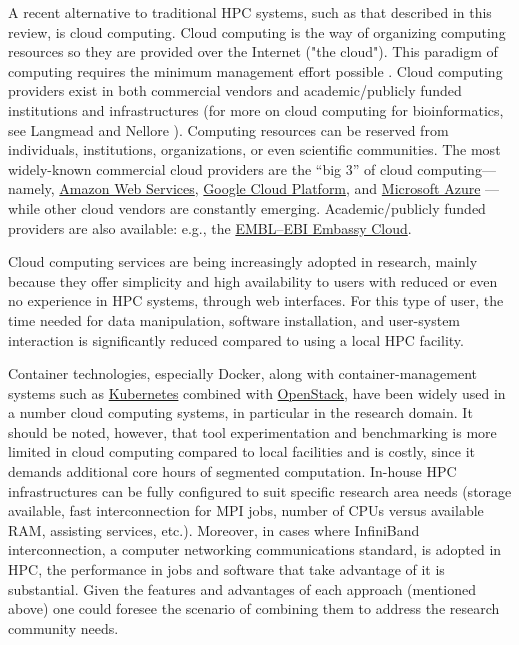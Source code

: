   A recent alternative to traditional HPC systems, such as that described in this review, is cloud computing. 
   Cloud computing is the way of organizing computing resources so they are provided over the Internet ("the cloud"). This paradigm of computing requires the minimum management effort possible \citep{mell2011nist}. 
   Cloud computing providers exist in both commercial vendors and academic/publicly funded institutions and infrastructures (for more on cloud computing for bioinformatics, see Langmead and Nellore \citep{langmead2018cloud}). 
   Computing resources can be reserved from individuals, institutions, organizations, or even scientific communities. 
   The most widely-known commercial cloud providers are the “big 3” of cloud computing—namely, 
   \href{https://aws.amazon.com/}{Amazon Web Services}, 
   \href{https://cloud.google.com/}{Google Cloud Platform}, and 
   \href{https://azure.microsoft.com/en-us/}{Microsoft Azure} — while other cloud vendors are constantly emerging. 
   Academic/publicly funded providers are also available: e.g., the \href{https://www.embassycloud.org/}{EMBL–EBI Embassy Cloud}.

   Cloud computing services are being increasingly adopted in research, mainly because they offer simplicity and high availability to users with reduced or even no experience in HPC systems, through web interfaces. 
   For this type of user, the time needed for data manipulation, software installation, and user-system interaction is significantly reduced compared to using a local HPC facility.

   Container technologies, especially Docker, along with container-management systems such as \href{https://kubernetes.io/}{Kubernetes} combined with \href{https://www.openstack.org/}{OpenStack}, have been widely used in a number cloud computing systems, in particular in the research domain. 
   It should be noted, however, that tool experimentation and benchmarking is more limited in cloud computing compared to local facilities and is costly, since it demands additional core hours of segmented computation. 
   In-house HPC infrastructures can be fully configured to suit specific research area needs (storage available, fast interconnection for MPI jobs, number of CPUs versus available RAM, assisting services, etc.). 
   Moreover, in cases where InfiniBand interconnection, a computer networking communications standard, is adopted in HPC, the performance in jobs and software that take advantage of it is substantial. 
   Given the features and advantages of each approach (mentioned above) one could foresee the scenario of combining them to address the research community needs.


